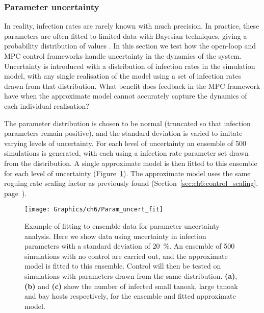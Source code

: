 \subsubsection{Parameter uncertainty}

In reality, infection rates are rarely known with much precision. In practice, these parameters are often fitted to limited data with Bayesian techniques, giving a probability distribution of values \citep[e.g.][]{kleczkowski_parameter_2007, parry_bayesian_2014}. In this section we test how the open-loop and MPC control frameworks handle uncertainty in the dynamics of the system. Uncertainty is introduced with a distribution of infection rates in the simulation model, with any single realisation of the model using a set of infection rates drawn from that distribution. What benefit does feedback in the MPC framework have when the approximate model cannot accurately capture the dynamics of each individual realisation?

The parameter distribution is chosen to be normal (truncated so that infection parameters remain positive), and the standard deviation is varied to imitate varying levels of uncertainty. For each level of uncertainty an ensemble of 500 simulations is generated, with each using a infection rate parameter set drawn from the distribution. A single approximate model is then fitted to this ensemble for each level of uncertainty (Figure~\ref{fig:ch6:param_uncert_fit}). The approximate model uses the same roguing rate scaling factor as previously found (Section~\ref{sec:ch6:control_scaling}, page~\pageref{sec:ch6:control_scaling}).

\begin{figure}[t]
    \begin{center}
        \texttt{[image: Graphics/ch6/Param\_uncert\_fit]}
        \caption[Ensemble fitting under parameter uncertainty]{Example of fitting to ensemble data for parameter uncertainty analysis. Here we show data using uncertainty in infection parameters with a standard deviation of \SI{20}{\percent}. An ensemble of 500 simulations with no control are carried out, and the approximate model is fitted to this ensemble. Control will then be tested on simulations with parameters drawn from the same distribution. \textbf{(a)}, \textbf{(b)} and \textbf{(c)} show the number of infected small tanoak, large tanoak and bay hosts respectively, for the ensemble and fitted approximate model.\label{fig:ch6:param_uncert_fit}}
    \end{center}
\end{figure}

